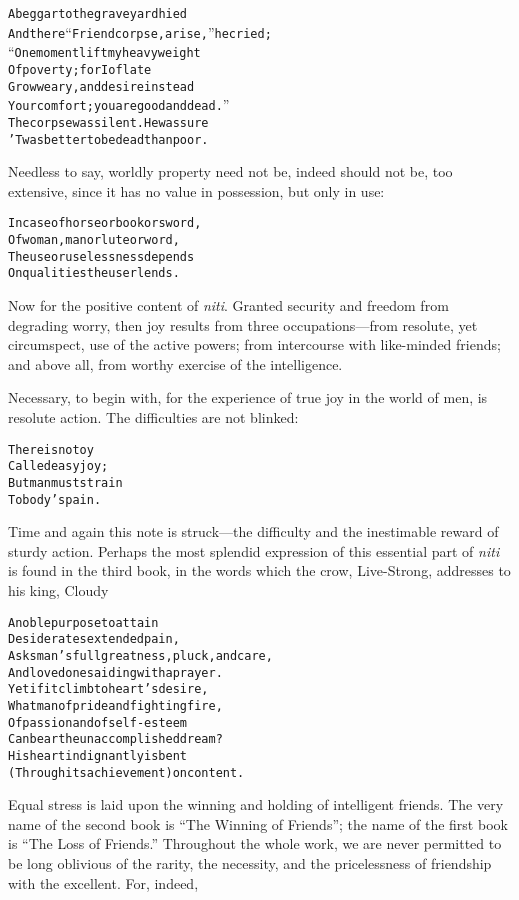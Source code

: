 \documentclass{article}
\renewenvironment{verbatim}{\begin{alltt}\normalfont\begin{centering}}{\end{centering}\end{alltt}}
\begin{document}
\begin{verbatim}
A beggar to the graveyard hied
And there “Friend corpse, arise,” he cried;
“One moment lift my heavy weight
Of poverty; for I of late
Grow weary, and desire instead
Your comfort; you are good and dead.”
The corpse was silent. He was sure
'Twas better to be dead than poor.
\end{verbatim}
Needless to say, worldly property need not be, indeed should not
be, too extensive, since it has no value in possession, but only in
use:

\begin{verbatim}
In case of horse or book or sword,
Of woman, man or lute or word,
The use or uselessness depends
On qualities the user lends.
\end{verbatim}
Now for the positive content of \emph{niti}. Granted security and
freedom from degrading worry, then joy results from three
occupations---from resolute, yet circumspect, use of the active
powers; from intercourse with like-minded friends; and above all,
from worthy exercise of the intelligence.

Necessary, to begin with, for the experience of true joy in the
world of men, is resolute action. The difficulties are not
blinked:

\begin{verbatim}
There is no toy
Called easy joy;
But man must strain
To body's pain.
\end{verbatim}
Time and again this note is struck---the difficulty and the
inestimable reward of sturdy action. Perhaps the most splendid
expression of this essential part of \emph{niti} is found in the
third book, in the words which the crow, Live-Strong, addresses to
his king, Cloudy

\begin{verbatim}
A noble purpose to attain
Desiderates extended pain,
Asks man's full greatness, pluck, and care,
And loved ones aiding with a prayer.
Yet if it climb to heart's desire,
What man of pride and fighting fire,
Of passion and of self-esteem
Can bear the unaccomplished dream?
His heart indignantly is bent
(Through its achievement) on content.
\end{verbatim}
Equal stress is laid upon the winning and holding of intelligent
friends. The very name of the second book is
``The Winning of Friends''; the name of the first book is
``The Loss of Friends.'' Throughout the whole work, we are never
permitted to be long oblivious of the rarity, the necessity, and
the pricelessness of friendship with the excellent. For, indeed,
\end{document}
